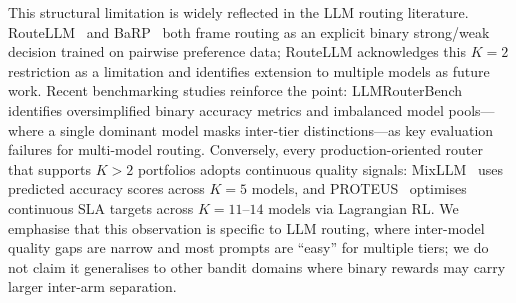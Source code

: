 This structural limitation is widely reflected in the LLM routing literature.
RouteLLM~\cite{ong2024routellm} and BaRP~\cite{wang2025barp} both frame routing as an explicit binary strong/weak decision trained on pairwise preference data; RouteLLM acknowledges this $K{=}2$ restriction as a limitation and identifies extension to multiple models as future work.
Recent benchmarking studies reinforce the point: LLMRouterBench~\cite{li2026llmrouterbench} identifies oversimplified binary accuracy metrics and imbalanced model pools---where a single dominant model masks inter-tier distinctions---as key evaluation failures for multi-model routing.
Conversely, every production-oriented router that supports $K{>}2$ portfolios adopts continuous quality signals: MixLLM~\cite{wang2025mixllm} uses predicted accuracy scores across $K{=}5$ models, and PROTEUS~\cite{bhatti2026proteus} optimises continuous SLA targets across $K{=}11$--$14$ models via Lagrangian RL.
We emphasise that this observation is specific to LLM routing, where inter-model quality gaps are narrow and most prompts are ``easy'' for multiple tiers; we do not claim it generalises to other bandit domains where binary rewards may carry larger inter-arm separation.

